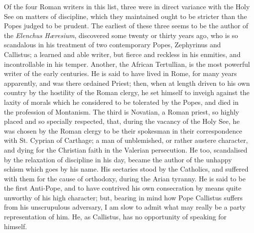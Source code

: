 Of the four Roman writers in this list, three were in direct
variance with the Holy See on matters of discipline, which they
maintained ought to be stricter than the Popes judged to be prudent.
The earliest of these three seems to be the author of the \emph{Elenchus
Hæresium}, discovered some twenty or thirty years ago, who is so
scandalous in his treatment of two contemporary Popes, Zephyrinus and
Callistus; a learned and able writer, but fierce and reckless in his
enmities, and incontrollable in his temper. Another, the African
Tertullian, is the most powerful writer of the early centuries. He is
said to have lived in Rome, for many years apparently, and was there
ordained Priest; then, when at length driven to his own country by the
hostility of the Roman clergy, he set himself to inveigh against the
laxity of morals which he considered to be tolerated by the Popes, and
died in the profession of Montanism. The third is Novatian, a Roman
priest, so highly placed and so specially respected, that, during the
vacancy of the Holy See, he was chosen by the Roman clergy to be their
spokesman in their correspondence with St. Cyprian of Carthage; a man
of unblemished, or rather austere character, and dying for the
Christian faith in the Valerian persecution. He too, scandalised by
the relaxation of discipline in his day, became the author of the
unhappy schism which goes by his name. His sectaries stood by the
Catholics, and suffered with them for the cause of orthodoxy, during
the Arian tyranny. He is said to be the first Anti-Pope, and to have
contrived his own consecration by means quite unworthy of his high
character; but, bearing in mind how Pope Callistus suffers from his
unscrupulous adversary, I am slow to admit what may really be a party
representation of him. He, as Callistus, has no opportunity of
speaking for himself.

